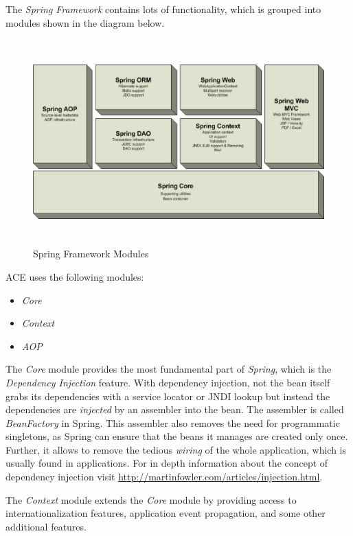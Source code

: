 The \emph{Spring Framework} contains lots of functionality, which is grouped
into modules shown in the diagram below.

\begin{figure}[H]
 \centering
 \includegraphics[width=15cm,height=7.9cm]{../images/finalreport/spring-overview.eps}
 \caption{Spring Framework Modules}
\end{figure}

ACE uses the following modules:
\begin{itemize}
 \item \emph{Core}
 \item \emph{Context}
 \item \emph{AOP}
\end{itemize}

The
\emph{Core} module provides the most fundamental part of \emph{Spring}, which
is the \emph{Dependency Injection} feature. With dependency injection,
not the bean itself grabs its dependencies with a service locator or
JNDI lookup but instead the dependencies are \emph{injected} by an
assembler into the bean. The assembler is called \emph{BeanFactory} in
Spring. This assembler also removes the need for programmatic singletons,
as Spring can ensure that the beans it manages are created only once. Further, 
it allows to remove the tedious \emph{wiring} of the whole application, which
is usually found in applications. For in depth information about
the concept of dependency injection visit 
\href{http://martinfowler.com/articles/injection.html}{http://martinfowler.com/\-articles/\-injection.html}.

The \emph{Context} module extends the \emph{Core} module by providing access
to internationalization features, application event propagation, and some
other additional features.

